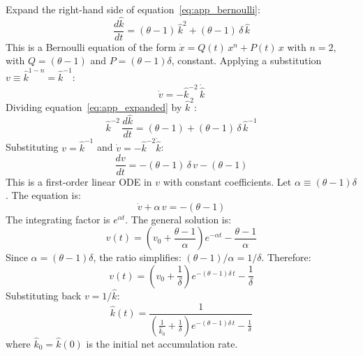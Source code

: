 Expand the right-hand side of equation~\eqref{eq:app_bernoulli}:
%
\begin{equation}\label{eq:app_expanded}
	\frac{d\hat{k}}{dt} = (\theta - 1)\,\hat{k}^2 + (\theta - 1)\,\delta\,\hat{k}
\end{equation}
%
This is a Bernoulli equation of the form $\dot{x} = Q(t)\,x^n + P(t)\,x$ with $n = 2$, with $Q = (\theta - 1)$ and $P = (\theta - 1)\delta$, constant. Applying a substitution $v \equiv \hat{k}^{1-n} = \hat{k}^{-1}$:
%
\begin{equation}\label{eq:app_sub}
	\dot{v} = -\hat{k}^{-2}\,\dot{\hat{k}}
\end{equation}
%
Dividing equation~\eqref{eq:app_expanded} by $\hat{k}^2$:
%
\begin{equation}\label{eq:app_divided}
	\hat{k}^{-2}\,\frac{d\hat{k}}{dt} = (\theta - 1) + (\theta - 1)\,\delta\,\hat{k}^{-1}
\end{equation}
%
Substituting $v = \hat{k}^{-1}$ and $\dot{v} = -\hat{k}^{-2}\dot{\hat{k}}$:
%
\begin{equation}\label{eq:app_linear}
	\frac{dv}{dt} = -(\theta - 1)\,\delta\,v - (\theta - 1)
\end{equation}
%
This is a first-order linear ODE in $v$ with constant coefficients. Let $\alpha \equiv (\theta - 1)\delta$. The equation is:
%
\begin{equation}\label{eq:app_linear_standard}
	\dot{v} + \alpha\,v = -(\theta - 1)
\end{equation}
%
The integrating factor is $e^{\alpha t}$. The general solution is:
%
\begin{equation}\label{eq:app_v_solution}
	v(t) = \left(v_0 + \frac{\theta - 1}{\alpha}\right) e^{-\alpha t} - \frac{\theta - 1}{\alpha}
\end{equation}
%
Since $\alpha = (\theta - 1)\delta$, the ratio simplifies: $(\theta - 1)/\alpha = 1/\delta$. Therefore:
%
\begin{equation}\label{eq:app_v_simplified}
	v(t) = \left(v_0 + \frac{1}{\delta}\right) e^{-(\theta-1)\delta\,t} - \frac{1}{\delta}
\end{equation}
%
Substituting back $v = 1/\hat{k}$:
%
\begin{equation}\label{eq:app_khat_solution}
	\boxed{\hat{k}(t) = \frac{1}{\left(\frac{1}{\hat{k}_0} + \frac{1}{\delta}\right) e^{-(\theta-1)\delta\,t} - \frac{1}{\delta}}}
\end{equation}
%
where $\hat{k}_0 = \hat{k}(0)$ is the initial net accumulation rate.


